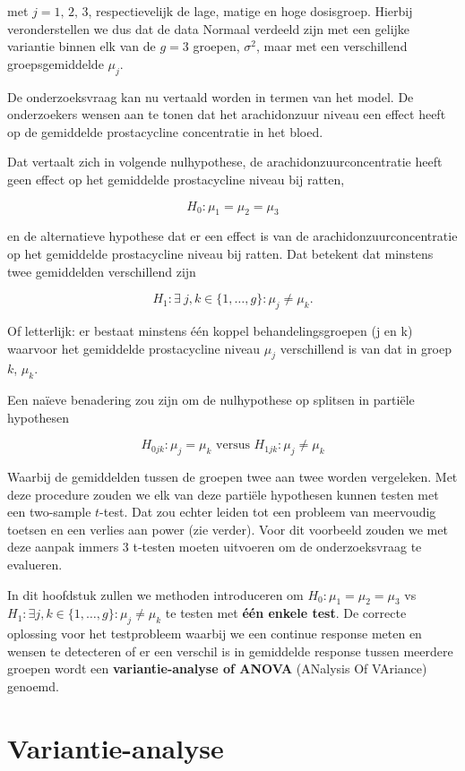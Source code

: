 \documentclass[
  12pt,dutch]{book}
\theoremstyle{definition}
\theoremstyle{definition}
\theoremstyle{definition}
\theoremstyle{definition}
\theoremstyle{remark}
\begin{document}
met \(j= \text{1, 2, 3}\), respectievelijk de lage, matige en hoge dosisgroep. Hierbij veronderstellen we dus dat de data Normaal verdeeld zijn met een gelijke variantie binnen elk van de \(g=3\) groepen, \(\sigma^2\), maar met een verschillend groepsgemiddelde \(\mu_j\).

De onderzoeksvraag kan nu vertaald worden in termen van het model.
De onderzoekers wensen aan te tonen dat het arachidonzuur niveau een effect heeft op de gemiddelde prostacycline concentratie in het bloed.

Dat vertaalt zich in volgende nulhypothese, de arachidonzuurconcentratie heeft geen effect op het gemiddelde prostacycline niveau bij ratten,

\[H_0:\mu_1=\mu_2 = \mu_3\]

en de alternatieve hypothese dat er een effect is van de arachidonzuurconcentratie op het gemiddelde prostacycline niveau bij ratten. Dat betekent dat minstens twee gemiddelden verschillend zijn

\[H_1: \exists\ j,k \in \{1,\ldots,g\} : \mu_j\neq\mu_k.\]

Of letterlijk: er bestaat minstens één koppel behandelingsgroepen (j en k) waarvoor het gemiddelde prostacycline niveau \(\mu_j\) verschillend is van dat in groep \(k\), \(\mu_k\).

Een naïeve benadering zou zijn om de nulhypothese op splitsen in partiële hypothesen

\[H_{0jk}: \mu_j=\mu_k \text{ versus } H_{1jk}: \mu_j \neq \mu_k\]

Waarbij de gemiddelden tussen de groepen twee aan twee worden vergeleken.
Met deze procedure zouden we elk van deze partiële hypothesen kunnen testen met een two-sample \(t\)-test.
Dat zou echter leiden tot een probleem van meervoudig toetsen en een verlies aan power (zie verder).
Voor dit voorbeeld zouden we met deze aanpak immers 3 t-testen moeten uitvoeren om de onderzoeksvraag te evalueren.

In dit hoofdstuk zullen we methoden introduceren om \(H_0:\mu_1=\mu_2=\mu_3\) vs \(H_1: \exists j,k \in \{1,\ldots,g\} : \mu_j\neq\mu_k\) te testen met \textbf{één enkele test}.
De correcte oplossing voor het testprobleem waarbij we een continue response meten en wensen te detecteren of er een verschil is in gemiddelde response tussen meerdere groepen wordt een \textbf{variantie-analyse of ANOVA} (ANalysis Of VAriance) genoemd.

\section{Variantie-analyse}\label{variantie-analyse}
\end{document}
